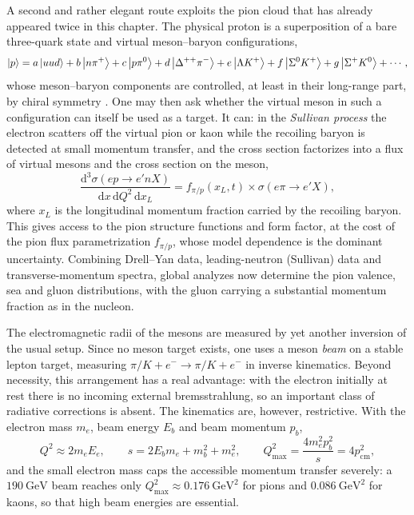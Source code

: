 A second and rather elegant route exploits the pion cloud that has already appeared twice
in this chapter. The physical proton is a superposition of a bare three-quark state and
virtual meson--baryon configurations,
\begin{equation}
    \ket{p} = a\ket{uud} + b\ket{n\pi^{+}} + c\ket{p\pi^{0}}
    + d\ket{\Delta^{++}\pi^{-}} + e\ket{\Lambda K^{+}}
    + f\ket{\Sigma^{0}K^{+}} + g\ket{\Sigma^{+}K^{0}} + \cdots,
    \label{eq:pion-cloud-expansion}
\end{equation}
whose meson--baryon components are controlled, at least in their long-range part, by
chiral symmetry \cite[Ch.~7]{ThomasWeise2001}. One may then ask whether the virtual meson
in such a configuration can itself be used as a target. It can: in the \emph{Sullivan
process} the electron scatters off the virtual pion
or kaon while the recoiling baryon is detected at small momentum transfer, and the cross
section factorizes into a flux of virtual mesons and the cross section on the meson,
\begin{equation}
    \frac{\mathrm{d}^{3}\sigma(ep\to e'nX)}{\mathrm{d}x\,\mathrm{d}Q^{2}\,\mathrm{d}x_{L}}
    = f_{\pi/p}(x_{L},t)\times\sigma(e\pi\to e'X),
    \label{eq:sullivan}
\end{equation}
where $x_{L}$ is the longitudinal momentum fraction carried by the recoiling baryon. This
gives access to the pion structure functions and form factor, at the cost of the pion flux
parametrization $f_{\pi/p}$, whose model dependence is the dominant uncertainty. Combining
Drell--Yan data, leading-neutron (Sullivan) data and transverse-momentum spectra, global
analyzes now determine the pion valence, sea and gluon distributions, with the gluon
carrying a substantial momentum fraction as in the nucleon.

The electromagnetic radii of the mesons are measured by yet another inversion of the usual
setup. Since no meson target exists, one uses a meson \emph{beam} on a stable lepton
target, measuring $\pi/K + e^{-}\to\pi/K + e^{-}$ in inverse kinematics. Beyond
necessity, this arrangement has a real advantage: with the electron initially at rest
there is no incoming external bremsstrahlung, so an important class of radiative
corrections is absent. The kinematics are, however, restrictive. With the electron mass
$m_{e}$, beam energy $E_{b}$ and beam momentum $p_{b}$,
\begin{equation}
    Q^{2} \approx 2m_{e}E_{e},
    \qquad
    s = 2E_{b}m_{e} + m_{b}^{2} + m_{e}^{2},
    \qquad
    Q^{2}_{\max} = \frac{4m_{e}^{2}p_{b}^{2}}{s} = 4p_{\mathrm{cm}}^{2},
    \label{eq:inverse-kinematics}
\end{equation}
and the small electron mass caps the accessible momentum transfer severely: a
$190~\mathrm{GeV}$ beam reaches only $Q^{2}_{\max}\approx 0.176~\mathrm{GeV}^{2}$ for
pions and $0.086~\mathrm{GeV}^{2}$ for kaons, so that high beam energies are essential.

